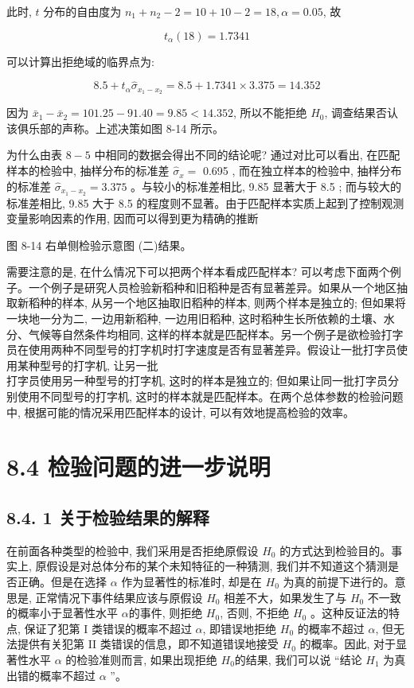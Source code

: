 \documentclass[10pt]{article}
\begin{document}
\begin{CJK*}{UTF8}{bsmi}
此时, $t$ 分布的自由度为 $n_{1}+n_{2}-2=10+10-2=18, \alpha=0.05$, 故

$$
t_{\alpha}(18)=1.7341
$$

可以计算出拒绝域的临界点为:

$$
8.5+t_{\alpha} \hat{\sigma}_{x_{1}-x_{2}}=8.5+1.7341 \times 3.375=14.352
$$

因为 $\bar{x}_{1}-\bar{x}_{2}=101.25-91.40=9.85<14.352$, 所以不能拒绝 $H_{0}$, 调查结果否认该俱乐部的声称。上述决策如图 8-14 所示。

为什么由表 $8-5$ 中相同的数据会得出不同的结论呢? 通过对比可以看出, 在匹配样本的检验中, 抽样分布的标准差 $\hat{\sigma}_{x}=$ 0.695 , 而在独立样本的检验中, 抽样分布的标准差 $\hat{\sigma}_{x_{1}-x_{2}}=3.375$ 。与较小的标准差相比, 9.85 显著大于 8.5 ; 而与较大的标准差相比, 9.85 大于 8.5 的程度则不显著。由于匹配样本实质上起到了控制观测变量影响因素的作用, 因而可以得到更为精确的推断

\begin{center}
\end{center}

图 8-14 右单侧检验示意图 (二)结果。

需要注意的是, 在什么情况下可以把两个样本看成匹配样本? 可以考虑下面两个例子。一个例子是研究人员检验新稻种和旧稻种是否有显著差异。如果从一个地区抽取新稻种的样本, 从另一个地区抽取旧稻种的样本, 则两个样本是独立的; 但如果将一块地一分为二, 一边用新稻种, 一边用旧稻种, 这时稻种生长所依赖的土壤、水分、气候等自然条件均相同, 这样的样本就是匹配样本。另一个例子是欲检验打字员在使用两种不同型号的打字机时打字速度是否有显著差异。假设让一批打字员使用某种型号的打字机, 让另一批\\
打字员使用另一种型号的打字机, 这时的样本是独立的; 但如果让同一批打字员分别使用不同型号的打字机, 这时的样本就是匹配样本。在两个总体参数的检验问题中, 根据可能的情况采用匹配样本的设计, 可以有效地提高检验的效率。

\section*{8.4 检验问题的进一步说明}
\subsection*{8.4. 1 关于检验结果的解释}
在前面各种类型的检验中, 我们采用是否拒绝原假设 $H_{0}$ 的方式达到检验目的。事实上, 原假设是对总体分布的某个未知特征的一种猜测, 我们并不知道这个猜测是否正确。但是在选择 $\alpha$ 作为显著性的标准时, 却是在 $H_{0}$ 为真的前提下进行的。意思是, 正常情况下事件结果应该与原假设 $H_{0}$ 相差不大，如果发生了与 $H_{0}$ 不一致的概率小于显著性水平 $\alpha$的事件, 则拒绝 $H_{0}$, 否则, 不拒绝 $H_{0}$ 。这种反证法的特点, 保证了犯第 I 类错误的概率不超过 $\alpha$, 即错误地拒绝 $H_{0}$ 的概率不超过 $\alpha$, 但无法提供有关犯第 II 类错误的信息，即不知道错误地接受 $H_{0}$ 的概率。因此, 对于显著性水平 $\alpha$ 的检验准则而言, 如果出现拒绝 $H_{0}$的结果, 我们可以说 “结论 $H_{1}$ 为真出错的概率不超过 $\alpha$ ”。


\end{CJK*}
\end{document}
